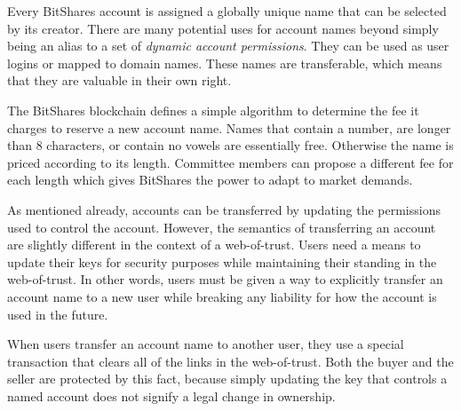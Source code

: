 Every BitShares account is assigned a globally unique name that can be selected
by its creator. There are many potential uses for account names beyond simply
being an alias to a set of \emph{dynamic account permissions}. They can be used
as user logins or mapped to domain names. These names are transferable, which
means that they are valuable in their own right.

The BitShares blockchain defines a simple algorithm to determine the fee it
charges to reserve a new account name. Names that contain a number, are longer
than 8 characters, or contain no vowels are essentially free. Otherwise the
name is priced according to its length. Committee members can propose a
different fee for each length which gives BitShares the power to adapt to
market demands.

As mentioned already, accounts can be transferred by updating the permissions
used to control the account. However, the semantics of transferring an account
are slightly different in the context of a web-of-trust. Users need a means to
update their keys for security purposes while maintaining their standing in the
web-of-trust. In other words, users must be given a way to explicitly transfer
an account name to a new user while breaking any liability for how the account
is used in the future.

When users transfer an account name to another user, they use a special
transaction that clears all of the links in the web-of-trust. Both the buyer
and the seller are protected by this fact, because simply updating the key that
controls a named account does not signify a legal change in ownership.
